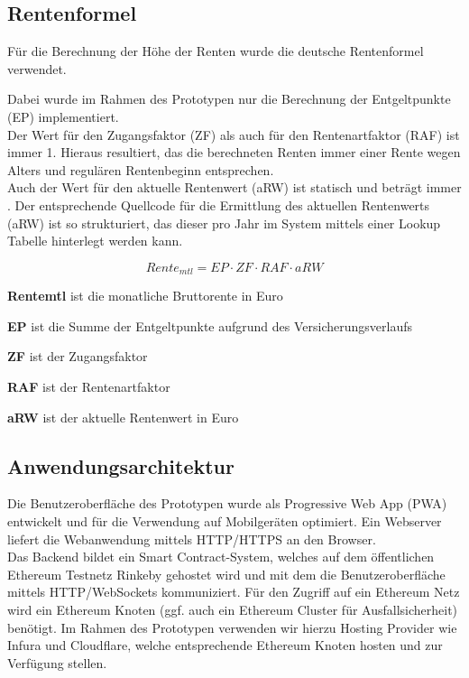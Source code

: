 \subsection{Rentenformel}
Für die Berechnung der Höhe der Renten wurde die deutsche Rentenformel verwendet.

Dabei wurde im Rahmen des Prototypen nur die Berechnung der Entgeltpunkte (EP) implementiert. 
\\
Der Wert für den Zugangsfaktor (ZF) als auch für den Rentenartfaktor (RAF) ist immer 1. Hieraus resultiert, das die berechneten Renten immer einer Rente wegen Alters und regulären Rentenbeginn entsprechen.
\\
Auch der Wert für den aktuelle Rentenwert (aRW) ist statisch und beträgt immer . Der entsprechende Quellcode für die Ermittlung des aktuellen Rentenwerts (aRW) ist so strukturiert, das dieser pro Jahr im System mittels einer Lookup Tabelle hinterlegt werden kann.

\begin{equation*}
Rente_{mtl} = EP \cdot ZF \cdot RAF \cdot aRW
\end{equation*}

\begin{compactitem}
\item \textbf{Rentemtl} ist die monatliche Bruttorente in Euro
\item \textbf{EP} ist die Summe der Entgeltpunkte aufgrund des Versicherungsverlaufs
\item \textbf{ZF} ist der Zugangsfaktor
\item \textbf{RAF} ist der Rentenartfaktor
\item \textbf{aRW} ist der aktuelle Rentenwert in Euro
\end{compactitem}


\subsection{Anwendungsarchitektur}
Die Benutzeroberfläche des Prototypen wurde als Progressive Web App (PWA) entwickelt und für die Verwendung auf Mobilgeräten optimiert. Ein Webserver liefert die Webanwendung mittels HTTP/HTTPS an den Browser.
\\
Das Backend bildet ein Smart Contract-System, welches auf dem öffentlichen Ethereum Testnetz Rinkeby gehostet wird und mit dem die Benutzeroberfläche mittels HTTP/WebSockets kommuniziert. Für den Zugriff auf ein Ethereum Netz wird ein Ethereum Knoten (ggf. auch ein Ethereum Cluster für Ausfallsicherheit) benötigt. Im Rahmen des Prototypen verwenden wir hierzu Hosting Provider wie Infura und Cloudflare, welche entsprechende Ethereum Knoten hosten und zur Verfügung stellen.

